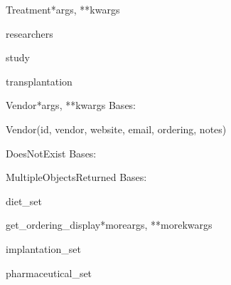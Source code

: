 \documentclass[letterpaper,10pt,english]{sphinxmanual}
\begin{document}
\begin{classdesc}{Treatment}{*args, **kwargs}
\hypertarget{data.models.Treatment.researchers}{}\begin{memberdesc}[Treatment]{researchers}\end{memberdesc}

\hypertarget{data.models.Treatment.study}{}\begin{memberdesc}[Treatment]{study}\end{memberdesc}

\hypertarget{data.models.Treatment.transplantation}{}\begin{memberdesc}[Treatment]{transplantation}\end{memberdesc}
\end{classdesc}

\hypertarget{data.models.Vendor}{}\begin{classdesc}{Vendor}{*args, **kwargs}
Bases: 

Vendor(id, vendor, website, email, ordering, notes)

\hypertarget{data.models.Vendor.DoesNotExist}{}\begin{excdesc}{DoesNotExist}
Bases: 
\end{excdesc}

\hypertarget{data.models.Vendor.MultipleObjectsReturned}{}\begin{excdesc}{MultipleObjectsReturned}
Bases: 
\end{excdesc}

\hypertarget{data.models.Vendor.diet\_set}{}\begin{memberdesc}[Vendor]{diet\_set}\end{memberdesc}

\hypertarget{data.models.Vendor.get\_ordering\_display}{}\begin{methoddesc}[Vendor]{get\_ordering\_display}{*moreargs, **morekwargs}\end{methoddesc}

\hypertarget{data.models.Vendor.implantation\_set}{}\begin{memberdesc}[Vendor]{implantation\_set}\end{memberdesc}

\hypertarget{data.models.Vendor.pharmaceutical\_set}{}\begin{memberdesc}[Vendor]{pharmaceutical\_set}\end{memberdesc}
\end{classdesc}
\end{document}
